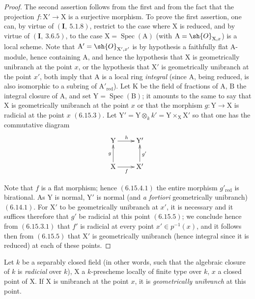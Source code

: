 \begin{proof}
The second assertion follows from the first and from the fact that the projection $f:\mathrm{X}'\to\mathrm{X}$
is a surjective morphism. To prove the first assertion, one can, by virtue of
$(\mathbf{I},~5.1.8)$, restrict to the case where $\mathrm{X}$ is reduced, and by virtue of $(\mathbf{I},~3.6.5)$, to the case
$\mathrm{X}=\operatorname{Spec}(\mathrm{A})$ (with $\mathrm{A}=\sh{O}_{\mathrm{X},x}$) is a local scheme. Note that $\mathrm{A}'=\sh{O}_{\mathrm{X}',x'}$ is
by hypothesis a faithfully flat $\mathrm{A}$-module, hence containing $\mathrm{A}$, and hence
the hypothesis that $\mathrm{X}$ is geometrically unibranch at the point $x$, or the hypothesis that $\mathrm{X}'$ is
geometrically unibranch at the point $x'$, both imply that $\mathrm{A}$ is a local ring
\emph{integral} (since $\mathrm{A}$, being reduced, is also isomorphic to a subring of $\mathrm{A}'_{\mathrm{red}}$).
Let $\mathrm{K}$ be the field of fractions of $\mathrm{A}$, $\mathrm{B}$ the integral closure of $\mathrm{A}$, and set $\mathrm{Y}=\operatorname{Spec}(\mathrm{B})$;
it amounts to the same to say that $\mathrm{X}$ is geometrically unibranch at the point $x$ or that
the morphism $g:\mathrm{Y}\to\mathrm{X}$ is radicial at the point $x$ $(6.15.3)$. Let $\mathrm{Y}'=\mathrm{Y}\otimes_k k'=\mathrm{Y}\times_\mathrm{X}\mathrm{X}'$
so that one has the commutative diagram
\[
\xymatrix{
  \mathrm{Y} \ar[r]^{h} & \mathrm{Y}' \\
  \mathrm{X} \ar[u]^{g} \ar[r]_{f} & \mathrm{X}' \ar[u]_{g'}
}
\]

Note that $f$ is a flat morphism; hence $(6.15.4.1)$ the entire morphism $g'_{\mathrm{red}}$ is
birational. As $\mathrm{Y}$ is normal, $\mathrm{Y}'$ is normal (and \emph{a fortiori} geometrically
unibranch) $(6.14.1)$. For $\mathrm{X}'$ to be geometrically unibranch at $x'$, it is necessary and it suffices therefore that
$g'$ be radicial at this point $(6.15.5)$; we conclude
hence from $(6.15.3.1)$ that $f'$ is radicial at every point $x'\in p^{-1}(x)$, and it follows then from
$(6.15.5)$ that $\mathrm{X}'$ is geometrically unibranch (hence integral since it is reduced)
at each of these points.
\end{proof}

\begin{lemma}[6.15.8]
\label{IV.6.15.8}
Let $k$ be a separably closed field (in other words, such that the
algebraic closure of $k$ is \emph{radicial} over $k$), $\mathrm{X}$ a $k$-prescheme locally of finite type over $k$,
$x$ a closed point of $\mathrm{X}$. If $\mathrm{X}$ is unibranch at the point $x$, it is \emph{geometrically unibranch} at this point.
\end{lemma}

